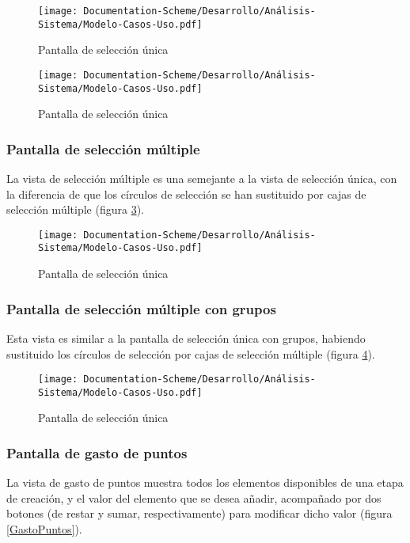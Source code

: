 \begin{figure}[H]
    \centering
    \texttt{[image: Documentation-Scheme/Desarrollo/Análisis-Sistema/Modelo-Casos-Uso.pdf]}
    \caption{Pantalla de selección única}
    \label{SeleccionUnicaGrupoCerrado}    
\end{figure}
\begin{figure}[H]
    \centering
    \texttt{[image: Documentation-Scheme/Desarrollo/Análisis-Sistema/Modelo-Casos-Uso.pdf]}
    \caption{Pantalla de selección única}
    \label{SeleccionUnicaGrupoAbierto}    
\end{figure}

\subsubsection{Pantalla de selección múltiple}
La vista de selección múltiple es una semejante a la vista de selección única, con la diferencia de que los círculos de selección 
se han sustituido por cajas de selección múltiple (figura \ref*{SeleccionMultiple}).

\begin{figure}[H]
    \centering
    \texttt{[image: Documentation-Scheme/Desarrollo/Análisis-Sistema/Modelo-Casos-Uso.pdf]}
    \caption{Pantalla de selección única}
    \label{SeleccionMultiple}    
\end{figure}

\subsubsection{Pantalla de selección múltiple con grupos}
Esta vista es similar a la pantalla de selección única con grupos, habiendo sustituido los círculos de selección por 
cajas de selección múltiple (figura \ref*{SeleccionMultipleGrupos}).

\begin{figure}[H]
    \centering
    \texttt{[image: Documentation-Scheme/Desarrollo/Análisis-Sistema/Modelo-Casos-Uso.pdf]}
    \caption{Pantalla de selección única}
    \label{SeleccionMultipleGrupos}    
\end{figure}

\subsubsection{Pantalla de gasto de puntos}
La vista de gasto de puntos muestra todos los elementos disponibles de una etapa de creación, y el valor del elemento 
que se desea añadir, acompañado por dos botones (de restar y sumar, respectivamente) para modificar dicho valor 
(figura \ref*{GastoPuntos}).


